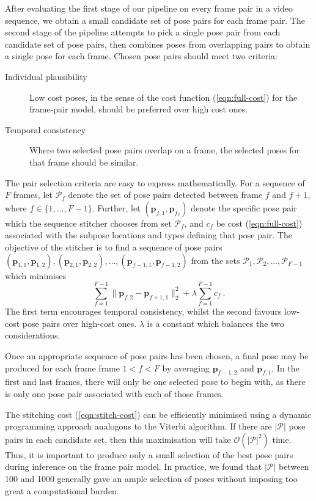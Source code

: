 \documentclass[runningheads]{llncs}
\newcommand{\mat}{\mathbf}
\begin{document}
After evaluating the first stage of our pipeline on every frame pair in a video
sequence, we obtain a small candidate set of pose pairs for each frame pair. The
second stage of the pipeline attempts to pick a single pose pair from each
candidate set of pose pairs, then combines poses from overlapping pairs to obtain
a single pose for each frame. Chosen pose pairs should meet two criteria:
%
\begin{description}
\item[Individual plausibility] Low cost poses, in the sense of the cost
function (\ref{eqn:full-cost}) for the frame-pair model, should be preferred over
high cost ones.
\item[Temporal consistency] Where two selected pose pairs overlap on a frame,
the selected poses for that frame should be similar.
\end{description}

The pair selection criteria are easy to express mathematically. For a sequence
of $F$ frames, let $\mathcal P_f$ denote the set of pose pairs detected between
frame $f$ and $f + 1$, where $f \in \{1, \ldots, F - 1\}$. Further, let $(\mat
p_{f,1}, \mat p_{f_2})$ denote the specific pose pair which the sequence
stitcher chooses from set $\mathcal P_f$, and $c_f$ be cost
(\ref{eqn:full-cost}) associated with the subpose locations and types defining
that pose pair. The objective of the stitcher is to find a sequence of pose
pairs $(\mat p_{1,1}, \mat p_{1,2}), (\mat p_{2,1}, \mat p_{2,2}), \ldots, (\mat
p_{f-1,1}, \mat p_{f-1,2})$ from the sets $\mathcal P_1, \mathcal P_2, \ldots,
\mathcal P_{F-1}$ which minimises
%
\begin{equation}\label{eqn:stitch-cost}
\sum_{f=1}^{F-1} \|\mat p_{f,2} - \mat p_{f+1,1}\|_2^2
+ \lambda \sum_{f=1}^{F-1} c_f~.
\end{equation}
%
The first term encourages temporal consistency, whilst the second favours
low-cost pose pairs over high-cost ones. $\lambda$ is a constant which balances
the two considerations.

Once an appropriate sequence of pose pairs has been chosen, a final pose may be
produced for each frame frame $1 < f < F$ by averaging $\mat p_{f-1,2}$ and
$\mat p_{f,1}$. In the first and last frames, there will only be one selected
pose to begin with, as there is only one pose pair associated with each of those
frames.

The stitching cost (\ref{eqn:stitch-cost}) can be efficiently minimised using a
dynamic programming approach analogous to the Viterbi algorithm. If there are
$|\mathcal P|$ pose pairs in each candidate set, then this maximisation will
take $\mathcal O(|\mathcal P|^2)$ time. Thus, it is important to produce only a
small selection of the best pose pairs during inference on the frame pair model.
In practice, we found that $|\mathcal P|$ between 100 and 1000 generally gave an
ample selection of poses without imposing too great a computational burden.
\end{document}
